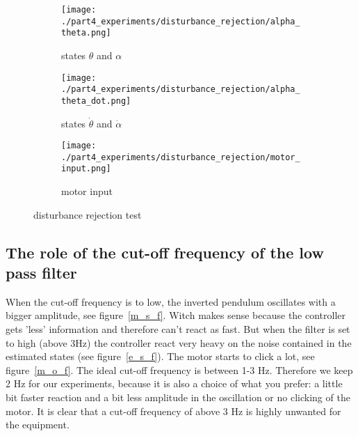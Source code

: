	\begin{figure}[H]
		\centering
		\begin{subfigure}[b]{0.45\textwidth}
			\texttt{[image: ./part4\_experiments/disturbance\_rejection/alpha\_theta.png]}
			\caption{states $\theta$ and $\alpha$}
		\end{subfigure}
		\begin{subfigure}[b]{0.45\textwidth}
			\texttt{[image: ./part4\_experiments/disturbance\_rejection/alpha\_theta\_dot.png]}
			\caption{states $\dot{\theta}$ and $\dot{\alpha}$}
		\end{subfigure}
		\begin{subfigure}[b]{0.45\textwidth}
			\texttt{[image: ./part4\_experiments/disturbance\_rejection/motor\_input.png]}
			\caption{motor input}
		\end{subfigure}
		\caption{disturbance rejection test}
		\label{dis_rej}
	\end{figure}
	

\subsection{The role of the cut-off frequency of the low pass filter}
When the cut-off frequency is to low, the inverted pendulum oscillates with a bigger amplitude, see figure~\ref{m_s_f}. Witch makes sense because the controller gets 'less' information and therefore can't react as fast.
But when the filter is set to high (above 3Hz) the controller react very heavy on the noise contained in the estimated states (see figure~\ref{e_s_f}). The motor starts to click a lot, see figure~\ref{m_o_f}. The ideal cut-off frequency is between 1-3 Hz. Therefore we keep 2 Hz for our experiments, because it is also a choice of what you prefer: a little bit faster reaction and a bit less amplitude in the oscillation or no clicking of the motor. It is clear that a cut-off frequency of above 3 Hz is highly unwanted for the equipment.

